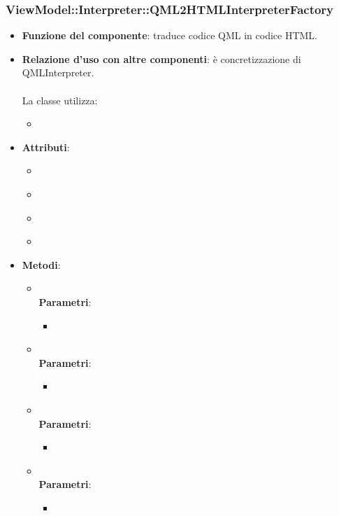 \subsubsection{ViewModel::Interpreter::QML2HTMLInterpreterFactory}
\begin{itemize}
\item\textbf{Funzione del componente}: traduce codice QML in codice HTML.
	\item\textbf{Relazione d'uso con altre componenti}: è concretizzazione di QMLInterpreter.\\ \\
La classe utilizza:
	\begin{itemize}
		\item
	\end{itemize}
\item\textbf{Attributi}:
	\begin{itemize}
		\item\code{}\\
		\item\code{}\\
		\item\code{}\\
		\item\code{}\\
	\end{itemize}
\item\textbf{Metodi}:
	\begin{itemize}
		\item\code{}\\
		\textbf{Parametri}:
			\begin{itemize}
				\item\code{}\\
			\end{itemize}
		\item\code{}\\
		\textbf{Parametri}:
			\begin{itemize}
				\item\code{}\\
			\end{itemize}
		\item\code{}\\
		\textbf{Parametri}:
			\begin{itemize}
				\item\code{}\\
			\end{itemize}
		\item\code{}\\
		\textbf{Parametri}:
			\begin{itemize}
				\item\code{}\\
			\end{itemize}
	\end{itemize}
\end{itemize}


